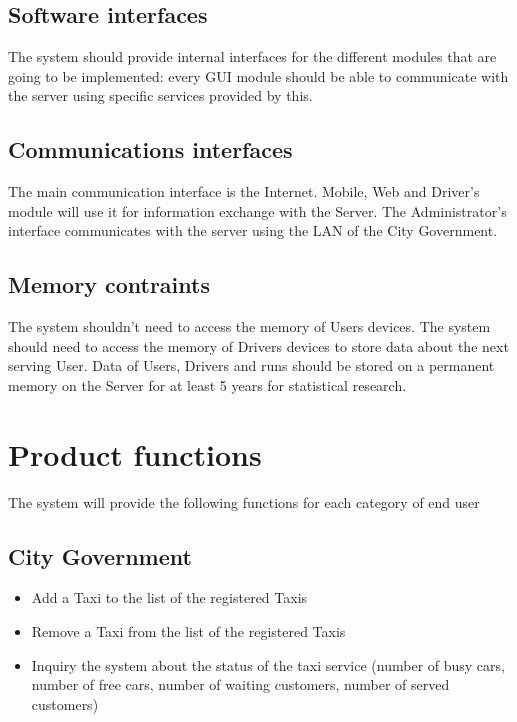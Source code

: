 \documentclass[12pt,a4paper]{book}
\begin{document}
			\subsection{Software interfaces}
			The system should provide internal interfaces for the different modules that are going to be implemented: every GUI module should be able to communicate with the server using specific services provided by this.
			\subsection{Communications interfaces}
			The main communication interface is the Internet. Mobile, Web and Driver's module will use it for information exchange with the Server. The Administrator's interface communicates with the server using the LAN of the City Government.
			\subsection{Memory contraints}
			The system shouldn't need to access the memory of Users devices.
			The system should need to access the memory of Drivers devices to store data about the next serving User.
			Data of Users, Drivers and runs should be stored on a permanent memory on the Server for at least 5 years for statistical research.
		\section{Product functions}
		The system will provide the following functions for each category of end user
			\subsection{City Government}
				\begin{itemize}
					\item[\textbullet] Add a Taxi to the list of the registered Taxis
					\item[\textbullet] Remove a Taxi from the list of the registered Taxis
					\item[\textbullet] Inquiry the system about the status of the taxi service (number of busy cars, number of free cars, number of waiting customers, number of served customers)
				\end{itemize}
\end{document}
